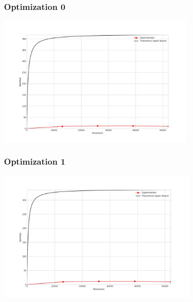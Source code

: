 \subsubsection{Optimization 0}
\begin{center}
    \resizebox{0.8\textwidth}{!}{}
    \includegraphics[width=0.73\textwidth]{../img/speedup-graph_type-tile-52000-O0}
\end{center}

\subsubsection{Optimization 1}
\begin{center}
    \resizebox{0.8\textwidth}{!}{}
    \includegraphics[width=0.74\textwidth]{../img/speedup-graph_type-tile-52000-O1}
\end{center}

\clearpage
